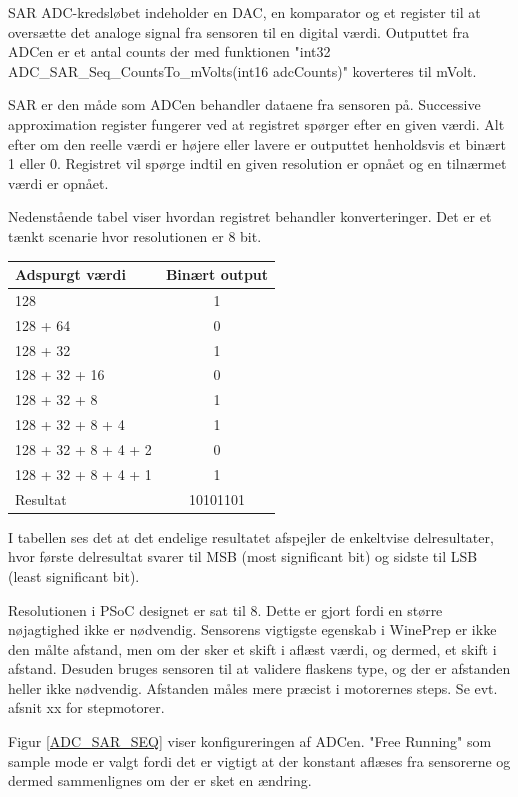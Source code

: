 SAR ADC-kredsløbet indeholder en DAC, en komparator og et register til at oversætte det analoge signal fra sensoren til en digital værdi. Outputtet fra ADCen er et antal counts der med funktionen "int32 ADC\_SAR\_Seq\_CountsTo_mVolts(int16 adcCounts)" koverteres til mVolt.

SAR er den måde som ADCen behandler dataene fra sensoren på. Successive approximation register fungerer ved at registret spørger efter en given værdi. Alt efter om den reelle værdi er højere eller lavere er outputtet henholdsvis et binært 1 eller 0. Registret vil spørge indtil en given resolution er opnået og en tilnærmet værdi er opnået.

Nedenstående tabel viser hvordan registret behandler konverteringer. Det er et tænkt scenarie hvor resolutionen er 8 bit.

\begin{table}
\begin{tabular}{| l | c |}
Adspurgt værdi & Binært output\\\hline
128 & 1\\\hline
128 + 64 & 0\\\hline
128 + 32 & 1\\\hline
128 + 32 + 16 & 0\\\hline
128 + 32 + 8 & 1\\\hline
128 + 32 + 8 + 4 & 1\\\hline
128 + 32 + 8 + 4 + 2 & 0\\\hline
128 + 32 + 8 + 4 + 1 & 1\\\hline
Resultat & 10101101\\\hline
\end{tabular}
\end{table}

I tabellen ses det at det endelige resultatet afspejler de enkeltvise delresultater, hvor første delresultat svarer til MSB (most significant bit) og sidste til LSB (least significant bit).

Resolutionen i PSoC designet er sat til 8. Dette er gjort fordi en større nøjagtighed ikke er nødvendig. Sensorens vigtigste egenskab i WinePrep er ikke den målte afstand, men om der sker et skift i aflæst værdi, og dermed, et skift i afstand. Desuden bruges sensoren til at validere flaskens type, og der er afstanden heller ikke nødvendig. Afstanden måles mere præcist i motorernes steps. Se evt. afsnit xx for stepmotorer.

Figur \ref{ADC_SAR_SEQ} viser konfigureringen af ADCen. "Free Running" som sample mode er valgt fordi det er vigtigt at der konstant aflæses fra sensorerne og dermed sammenlignes om der er sket en ændring.

